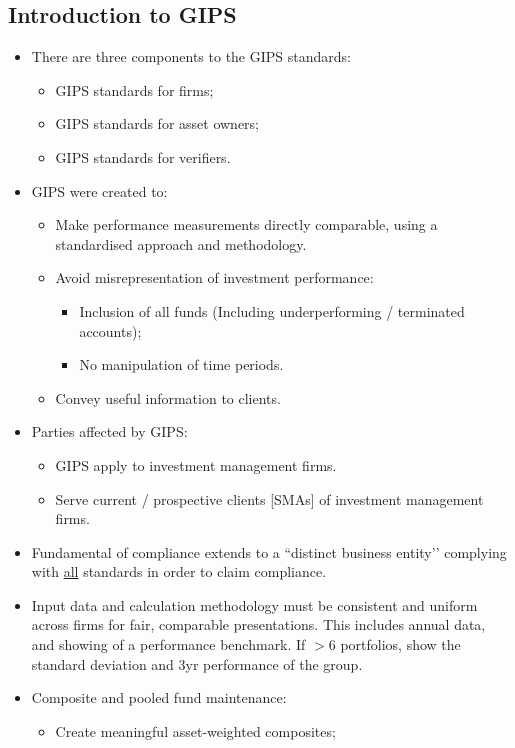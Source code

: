 \documentclass[../notes_compiled.tex]{subfiles}
\begin{document}
\subsection{Introduction to GIPS}
\begin{itemize}
\item There are three components to the GIPS standards:
\begin{itemize}
\item GIPS standards for firms;
\item GIPS standards for asset owners;
\item GIPS standards for verifiers.
\end{itemize}
\item GIPS were created to:
\begin{itemize}
\item Make performance measurements directly comparable, using a standardised approach and methodology.
\item Avoid misrepresentation of investment performance:
\begin{itemize}
\item Inclusion of all funds (Including underperforming / terminated accounts);
\item No manipulation of time periods.
\end{itemize}
\item Convey useful information to clients.
\end{itemize}
\item Parties affected by GIPS:
\begin{itemize}
\item GIPS apply to investment management firms.
\item Serve current / prospective clients [SMAs] of investment management firms.
\end{itemize}
\item Fundamental of compliance extends to a ``distinct business entity’’ complying with \underline{all} standards in order to claim compliance.
\item Input data and calculation methodology must be consistent and uniform across firms for fair, comparable presentations. This includes annual data, and showing of a performance benchmark. If $>6$ portfolios, show the standard deviation and 3yr performance of the group.
\item Composite and pooled fund maintenance:
\begin{itemize}
\item Create meaningful asset-weighted composites;

\end{itemize}
\end{itemize}
\end{document}

